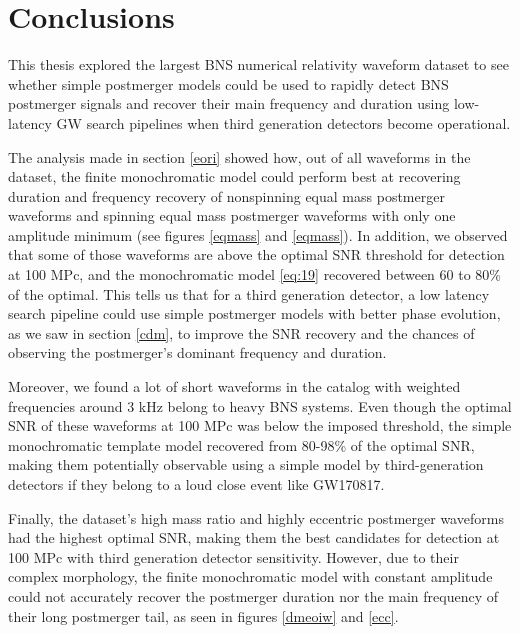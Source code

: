 \newpage
{}

\chapter*{Conclusions}


This thesis explored the largest BNS numerical relativity waveform dataset to see whether simple postmerger models could be used to rapidly detect BNS postmerger signals and recover their main frequency and duration using low-latency GW search pipelines when third generation detectors become operational.
 
The analysis made in section \ref{eori} showed how, out of all waveforms in the dataset,  the finite monochromatic model could perform best at recovering duration and frequency recovery of nonspinning equal mass postmerger waveforms and spinning equal mass postmerger waveforms with only one amplitude minimum (see figures \ref{eqmass} and \ref{eqmass}). In addition, we observed that some of those waveforms are above the optimal SNR threshold for detection at 100 MPc, and the monochromatic model \ref{eq:19} recovered between 60 to 80\% of the optimal. This tells us that for a third generation detector, a low latency search pipeline could use simple postmerger models with better phase evolution, as we saw in section \ref{cdm}, to improve the SNR recovery and the chances of observing the postmerger's dominant frequency and duration. 

Moreover, we found a lot of short waveforms in the catalog with weighted frequencies around 3 kHz belong to heavy BNS systems. Even though the optimal SNR of these waveforms at 100 MPc was below the imposed threshold,  the simple monochromatic template model recovered from 80-98\% of the optimal SNR, making them potentially observable using a simple model by third-generation detectors if they belong to a loud close event like GW170817.

Finally, the dataset's high mass ratio and highly eccentric postmerger waveforms had the highest optimal SNR, making them the best candidates for detection at 100 MPc with third generation detector sensitivity. However, due to their complex morphology, the finite monochromatic model with constant amplitude could not accurately recover the postmerger duration nor the main frequency of their long postmerger tail, as seen in figures \ref{dmeoiw} and \ref{ecc}. 







 








